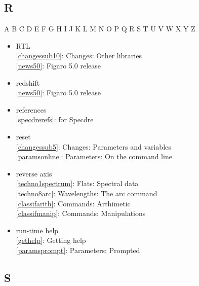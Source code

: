 \documentclass[11pt,twoside]{article}
\newcommand{\htmlref}[2]{#1}
\newcommand{\idxint}[2]{\ref{#1}: \htmlref{#2}{#1}}
\newcommand{\idxint}[2]{\htmlref{#2}{#1}}
\begin{document}
\subsection*{\label{index_R}R}

\begin{htmlonly}
\htmlref{A}{index_A}
\htmlref{B}{index_B}
\htmlref{C}{index_C}
\htmlref{D}{index_D}
\htmlref{E}{index_E}
\htmlref{F}{index_F}
\htmlref{G}{index_G}
\htmlref{H}{index_H}
\htmlref{I}{index_I}
\htmlref{J}{index_J}
\htmlref{K}{index_K}
\htmlref{L}{index_L}
\htmlref{M}{index_M}
\htmlref{N}{index_N}
\htmlref{O}{index_O}
\htmlref{P}{index_P}
\htmlref{Q}{index_Q}
R
\htmlref{S}{index_S}
\htmlref{T}{index_T}
\htmlref{U}{index_U}
\htmlref{V}{index_V}
\htmlref{W}{index_W}
\htmlref{X}{index_X}
\htmlref{Y}{index_Y}
Z
\end{htmlonly}

\begin{itemize}
\item RTL\\
   \idxint{changessub10}{Changes: Other libraries}\\
   \idxint{news50}{Figaro 5.0 release}
\item redshift\\
   \idxint{news50}{Figaro 5.0 release}
\item references\\
   \idxint{specdrerefs}{for Specdre}
\item reset\\
   \idxint{changessub5}{Changes: Parameters and variables}\\
   \idxint{paramsonline}{Parameters: On the command line}
\item reverse axis\\
   \idxint{techno1spectrum}{Flats: Spectral data}\\
   \idxint{techno8arc}{Wavelengths: The arc command}\\
   \idxint{classifarith}{Commands: Arthimetic}\\
   \idxint{classifmanip}{Commands: Manipulations}
\item run-time help\\
   \idxint{gethelp}{Getting help}\\
   \idxint{paramsprompt}{Parameters: Prompted}
\end{itemize}

\subsection*{\label{index_S}S}
\end{document}
